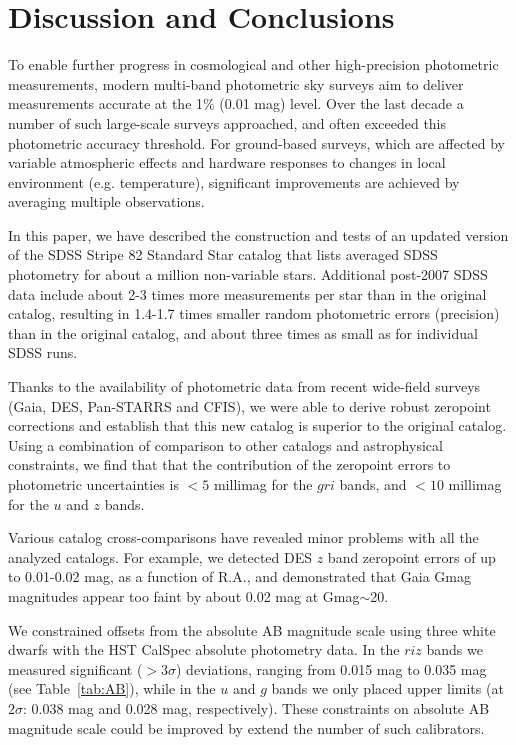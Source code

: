 \documentclass[fleqn,usenatbib]{mnras}
\begin{document}
\section{Discussion and Conclusions} \label{sec:disc}

To enable further progress in cosmological and other high-precision photometric measurements, 
modern multi-band photometric sky surveys aim to deliver measurements accurate at the 1\% 
(0.01 mag) level. Over the last decade a number of such large-scale surveys approached, and
often exceeded this photometric accuracy threshold. For ground-based surveys, which are 
affected by variable atmospheric effects and hardware responses to changes in local environment
(e.g. temperature), significant improvements are achieved by averaging multiple observations. 

In this paper, we have described the construction and tests of an updated version of the
SDSS Stripe 82 Standard Star catalog \citep{Ivez07} that lists averaged SDSS photometry for about
a million non-variable stars. Additional post-2007 SDSS data include about 
2-3 times more measurements per star than in the original catalog, resulting in 1.4-1.7 times smaller 
random photometric errors (precision) than in the original catalog, and about three times as small 
as for individual SDSS runs.

Thanks to the availability of photometric data from recent wide-field surveys (Gaia, DES, Pan-STARRS
and CFIS), we were able to derive robust zeropoint corrections and establish that this new catalog
is superior to the original catalog. Using a combination of comparison to other catalogs and 
astrophysical constraints, we find that that the contribution of the zeropoint errors to photometric
uncertainties is $<5$ millimag for the $gri$ bands, and $<10$ millimag for the $u$ and $z$ bands. 

Various catalog cross-comparisons have revealed minor problems with all the analyzed catalogs.
For example, we detected DES $z$ band zeropoint errors of up to 0.01-0.02 mag, as a function 
of R.A., and demonstrated that Gaia Gmag magnitudes appear too faint by about 0.02 mag at
Gmag$\sim$20.
 
We constrained offsets from the absolute AB magnitude scale using three white dwarfs with the 
HST CalSpec absolute photometry data. In the $riz$ bands we measured significant ($>3\sigma$) 
deviations, ranging from 0.015 mag to 0.035 mag (see Table~\ref{tab:AB}), while in the $u$ and $g$ 
bands we only placed upper limits (at $2\sigma$: 0.038 mag and 0.028 mag, respectively). These
constraints on absolute AB magnitude scale could be improved by extend the number of such 
calibrators.
\end{document}
